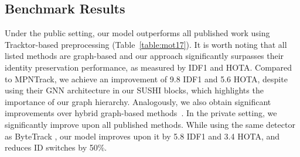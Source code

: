 \documentclass[10pt,twocolumn,letterpaper]{article}
\begin{document}
{{\subsection{Benchmark Results}


 Under the public setting, our model outperforms all published work using Tracktor-based preprocessing (Table~\ref{table:mot17}). It is worth noting that all listed methods are graph-based and our approach significantly surpasses their identity preservation performance, as measured by IDF1 and HOTA. Compared to MPNTrack, we achieve an improvement of 9.8 IDF1 and 5.6 HOTA, despite using their GNN architecture in our SUSHI blocks, which highlights the importance of our graph hierarchy. Analogously, we also obtain significant improvements over hybrid graph-based methods~\cite{aplift, lift, lpc}. In the private setting, we significantly improve upon all published methods. While using the same detector as ByteTrack \cite{bytetrack}, our model improves upon it by 5.8 IDF1 and 3.4 HOTA, and reduces ID switches by 50\%. \begin{table}[h]
\center
\tabcolsep=0.11cm

\end{table}}}
\end{document}
